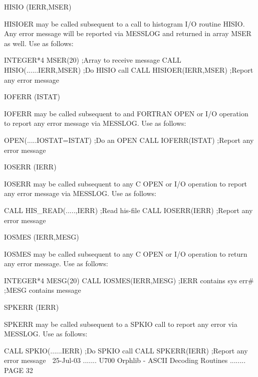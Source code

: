    HISIO              (IERR,MSER)
 
                       HISIOER may be called subsequent to a call to histogram
                       I/O routine HISIO. Any error message will be reported
                       via MESSLOG and returned in array MSER as well.
                       Use as follows:
 
                       INTEGER*4 MSER(20)           ;Array to receive message
                       CALL HISIO(......IERR,MSER)  ;Do HISIO call
                       CALL HISIOER(IERR,MSER)      ;Report any error message
 
   IOFERR             (ISTAT)
 
                       IOFERR may be called subsequent to and FORTRAN  OPEN
                       or I/O operation to report any error message via
                       MESSLOG. Use as follows:
 
                       OPEN(.....IOSTAT=ISTAT)      ;Do an OPEN
                       CALL IOFERR(ISTAT)           ;Report any error message
 
   IOSERR             (IERR)
 
                       IOSERR may be called subsequent to any C  OPEN or I/O
                       operation to report any error message via MESSLOG.
                       Use as follows:
 
                       CALL HIS_READ(.....,IERR)     ;Read his-file
                       CALL IOSERR(IERR)             ;Report any error message
 
   IOSMES             (IERR,MESG)
 
                       IOSMES may be called subsequent to any C  OPEN or I/O
                       operation to return any error message. Use as follows:
 
                       INTEGER*4 MESG(20)
                       CALL IOSMES(IERR,MESG)        ;IERR contains sys err#
                                                     ;MESG contains message
 
   SPKERR              (IERR)
 
                        SPKERR may be called subsequent to a SPKIO call to
                        report any error via MESSLOG.
                        Use as follows:
 
                        CALL SPKIO(......IERR)        ;Do SPKIO call
                        CALL SPKERR(IERR)             ;Report any error message
    
   25-Jul-03 ....... U700  Orphlib - ASCII Decoding Routines ........ PAGE  32
 
